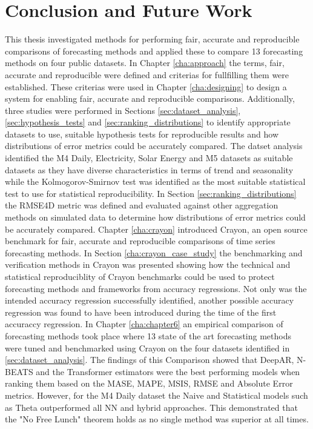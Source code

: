 \chapter{Conclusion and Future Work}
\label{cha:chapter7}
This thesis investigated methods for performing fair, accurate and reproducible comparisons of forecasting methods and applied these to compare 13 forecasting methods on four public datasets. In Chapter \ref{cha:approach} the terms, fair, accurate and reproducible were defined and criterias for fullfilling them were established. These criterias were used in Chapter \ref{cha:designing} to design a system for enabling fair, accurate and reproducible comparisons. Additionally, three studies were performed in Sections \ref{sec:dataset_analysis}, \ref{sec:hypothesis_tests} and \ref{sec:ranking_distributions} to identify appropriate datasets to use, suitable hypothesis tests for reproducible results and how distributions of error metrics could be accurately compared. The datset analysis identified the M4 Daily, Electricity, Solar Energy and M5 datasets as suitable datasets as they have diverse characteristics in terms of trend and seasonality while the Kolmogorov-Smirnov test was identified as the most suitable statistical test to use for statistical reproducibility. In Section \ref{sec:ranking_distributions} the RMSE4D metric was defined and evaluated against other aggregation methods on simulated data to determine how distributions of error metrics could be accurately compared. Chapter \ref{cha:crayon} introduced Crayon, an open source benchmark for fair, accurate and reproducible comparisons of time series forecasting methods. In Section \ref{cha:crayon_case_study} the benchmarking and verification methods in Crayon was presented showing how the technical and statistical reproduciblity of Crayon benchmarks could be used to protect forecasting methods and frameworks from accuracy regressions. Not only was the intended accuracy regression successfully identified, another possible accuracy regression was found to have been introduced during the time of the first accuraccy regression. In Chapter \ref{cha:chapter6} an empirical comparison of forecasting methods took place where 13 state of the art forecasting methods were tuned and benchmarked using Crayon on the four datasets identified in \ref{sec:dataset_analysis}. The findings of this Comparison showed that DeepAR, N-BEATS and the Transformer estimators were the best performing models when ranking them based on the MASE, MAPE, MSIS, RMSE and Absolute Error metrics. However, for the M4 Daily dataset the Naive and Statistical models such as Theta outperformed all NN and hybrid approaches. This demonstrated that the "No Free Lunch" theorem holds as no single method was superior at all times.

